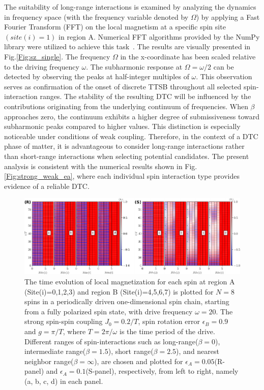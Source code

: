 \documentclass[12pt]{iopart}
\begin{document}
The suitability of long-range interactions is examined by analyzing the dynamics in frequency space (with the frequency variable denoted by $\Omega$) by applying a Fast Fourier Transform (FFT) on the local magnetism at a specific spin site $(site(i)=1)$ in region A. Numerical FFT algorithms provided by the NumPy library were utilized to achieve this task~\cite{harris2020array}. The results are visually presented in Fig.\ref{Fig:sz_single}.  The frequency $\Omega$ in the x-coordinate has been scaled relative to the driving frequency $\omega$. The subharmonic response at $\Omega=\omega/2$ can be detected by observing the peaks at half-integer multiples of $\omega$. This observation serves as confirmation of the onset of discrete TTSB throughout all selected spin-interaction ranges. The stability of the resulting DTC will be influenced by the contributions originating from the underlying continuum of frequencies. When $\beta$ approaches zero, the continuum exhibits a higher degree of submissiveness toward subharmonic peaks compared to higher values. This distinction is especially noticeable under conditions of weak coupling. Therefore, in the context of a DTC phase of matter, it is advantageous to consider long-range interactions rather than short-range interactions when selecting potential candidates. The present analysis is consistent with the numerical results shown in Fig.\ref{Fig:strong_weak_ea}, where each individual spin interaction type provides evidence of a reliable DTC.	
\begin{figure}[t!]
\centering
\includegraphics[width=15.cm]{EASJ_N_8.pdf}
\caption{The time evolution of local magnetization for each spin at region A (Site(i)=0,1,2,3) and region B (Site(i)=4,5,6,7) is plotted for $N=8$ spins in a periodically driven one-dimensional spin chain, starting from a fully polarized spin state, with drive frequency $\omega=20$. The strong spin-spin coupling $J_0 = 0.2/T$, spin rotation error $\epsilon_B = 0.9$ and $g=\pi/T$, where $T=2\pi/\omega$ is the time period of the drive.  Different ranges of spin-interactions such as long-range($\beta=0$), intermediate range($\beta=1.5$), short range($\beta=2.5$), and nearest neighbor range($\beta=\infty$), are chosen and plotted  for $\epsilon_A =0.05$(R-panel) and $\epsilon_A =0.1$(S-panel), respectively, from left to right, namely (a, b, c, d) in each panel.}
\label{Fig:ea}
\end{figure}
\end{document}
